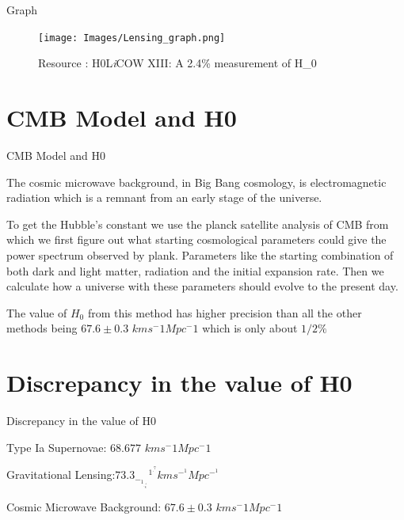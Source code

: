 \documentclass[aspectratio=169]{beamer}                    %
\begin{document}
\begin{frame}{Graph}
    \begin{figure}[htp]
        \centering
        \texttt{[image: Images/Lensing\_graph.png]}
        \caption{Resource : H0L\emph{i}COW XIII: A 2.4\% measurement of H_0}
        \label{fig:Lensing_graph}
    \end{figure}
\end{frame}



\section{CMB Model and H0}
\begin{frame}{CMB Model and H0}
    \begin{vfilleditems}
        \item The cosmic microwave background, in Big Bang cosmology, is electromagnetic radiation which is a remnant from an early stage of the universe.
        \item To get the Hubble's constant we use the planck satellite analysis of CMB from which we first figure out what starting cosmological parameters could give the power spectrum observed by plank. Parameters like the starting combination of both dark and light matter, radiation and the initial expansion rate.
        Then we calculate how a universe with these parameters should evolve to the present day.
        \item The value of $H_0$ from this method has higher precision than all the other methods being $67.6 \pm 0.3$ $km s^-1 Mpc^-1$ which is only about $1/2\%$
    \end{vfilleditems}
\end{frame}

\section{Discrepancy in the value of H0}
\begin{frame}{Discrepancy in the value of H0}
    \begin{vfilleditems}
        
        \item Type Ia Supernovae: $68.677$ $km s^-1 Mpc^-1$
        \item Gravitational Lensing:$73.3_-_1_._8^+^1^.^7 km s^-^1Mpc^-^1$
        \item Cosmic Microwave Background: $67.6 \pm 0.3$ $km s^-1 Mpc^-1$
    \end{vfilleditems}
\end{frame}
\end{document}
